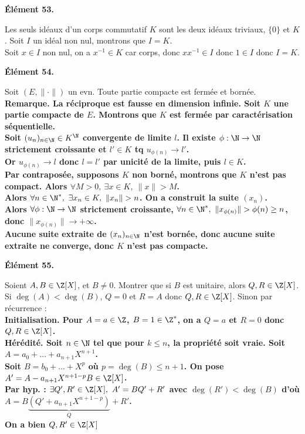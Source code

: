 \documentclass[11pt]{article}
\begin{document}
\bf{Élément 53.}

\begin{ex}{}{}
    Les seuls idéaux d'un corps commutatif $K$ sont les deux idéaux triviaux, $\{0\}$ et $K$.
    \tcblower
    Soit $I$ un idéal non nul, montrons que $I=K$.\\
    Soit $x\in I$ non nul, on a $x^{-1}\in K$ car corps, donc $xx^{-1}\in I$ donc $1\in I$ donc $I=K$.
\end{ex}

\bf{Élément 54.}

\begin{prop}{}{}
    Soit $(E,\|\cdot\|)$ un evn. Toute partie compacte est fermée et bornée.\\
    \bf{Remarque.} La réciproque est fausse en dimension infinie.
    \tcblower
    Soit $K$ une partie compacte de $E$. Montrons que $K$ est fermée par caractérisation séquentielle.\\
    Soit $(u_n)_{n\in\N}\in K^\N$ convergente de limite $l$. Il existe $\phi:\N\to\N$ strictement croissante et $l'\in K$ tq $u_{\phi(n)}\to l'$.\\
    Or $u_{\phi(n)}\to l$ donc $l=l'$ par unicité de la limite, puis $l\in K$.\\
    Par contraposée, supposons $K$ non borné, montrons que $K$ n'est pas compact. Alors $\forall M > 0, ~ \exists x \in K, ~ \|x\|>M$.\\
    Alors $\forall n \in \N^*, ~ \exists x_n \in K, ~ \|x_n\|>n$. On a construit la suite $(x_n)$.\\
    Alors $\forall \phi : \N \to \N$ strictement croissante, $\forall n \in \N^*, ~ \|x_{\phi(n)}\|>\phi(n)\geq n$, donc $\|x_{\phi(n)} \| \to +\infty$.\\
    Aucune suite extraite de $(x_n)_{n\in\N}$ n'est bornée, donc aucune suite extraite ne converge, donc $K$ n'est pas compacte.
\end{prop}

\bf{Élément 55.}

\begin{exi}{}{}
    Soient $A,B\in\Z[X]$, et $B\neq0$. Montrer que si $B$ est unitaire, alors $Q,R\in\Z[X]$.
    \tcblower
    Si $\deg(A)<\deg(B)$, $Q=0$ et $R=A$ donc $Q,R\in\Z[X]$. Sinon par récurrence :\\
    \bf{Initialisation.} Pour $A=a\in\Z$, $B=1\in\Z^*$, on a $Q=a$ et $R=0$ donc $Q,R\in\Z[X]$.\\
    \bf{Hérédité.} Soit $n\in\N$ tel que pour $k\leq n$, la propriété soit vraie. Soit $A=a_0+...+a_{n+1}X^{n+1}$.\\
    Soit $B=b_0+...+X^p$ où $p=\deg(B)\leq n+1$. On pose $A'=A-a_{n+1}X^{n+1-p}B\in\Z[X]$.\\
    Par hyp. : $\exists Q',R'\in\Z[X], ~ A'=BQ'+R'$ avec $\deg(R')<\deg(B)$ d'où $A=B\underbrace{(Q'+a_{n+1}X^{n+1-p})}_{Q}+R'$.\\
    On a bien $Q,R'\in\Z[X]$
\end{exi}
\end{document}
